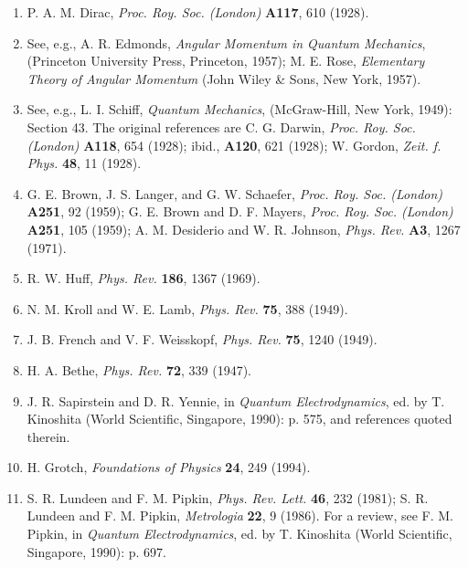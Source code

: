 \begin{enumerate}
\item \hypertarget{ref:14.1}{}P. A. M. Dirac, \emph{Proc. Roy. Soc.
(London)} \textbf{A117}, 610 (1928).

\item \hypertarget{ref:14.2}{}See, e.g., A. R. Edmonds, \emph{Angular
Momentum in Quantum Mechanics}, (Princeton University Press, Princeton,
1957); M. E. Rose, \emph{Elementary Theory of Angular Momentum} (John Wiley
\& Sons, New York, 1957).

\item \hypertarget{ref:14.3}{}See, e.g., L. I. Schiff, \emph{Quantum
Mechanics}, (McGraw-Hill, New York, 1949): Section 43. The original references
are C. G. Darwin, \emph{Proc. Roy. Soc. (London)} \textbf{A118}, 654 (1928);
ibid., \textbf{A120}, 621 (1928); W. Gordon, \emph{Zeit. f. Phys.} \textbf{48},
11 (1928).

\item \hypertarget{ref:14.4}{}G. E. Brown, J. S. Langer, and G. W. Schaefer,
\emph{Proc. Roy. Soc. (London)} \textbf{A251}, 92 (1959); G. E. Brown and
D. F. Mayers, \emph{Proc. Roy. Soc. (London)} \textbf{A251}, 105 (1959);
A. M. Desiderio and W. R. Johnson, \emph{Phys. Rev.} \textbf{A3}, 1267
(1971).

\item \hypertarget{ref:14.5}{}R. W. Huff, \emph{Phys. Rev.} \textbf{186},
1367 (1969).

\item \hypertarget{ref:14.6}{}N. M. Kroll and W. E. Lamb, \emph{Phys. Rev.}
\textbf{75}, 388 (1949).

\item \hypertarget{ref:14.7}{}J. B. French and V. F. Weisskopf,
\emph{Phys. Rev.} \textbf{75}, 1240 (1949).

\item \hypertarget{ref:14.8}{}H. A. Bethe, \emph{Phys. Rev.} \textbf{72},
339 (1947).

\item \hypertarget{ref:14.9}{}J. R. Sapirstein and D. R. Yennie, in
\emph{Quantum Electrodynamics}, ed. by T. Kinoshita (World Scientific,
Singapore, 1990): p. 575, and references quoted therein.

\item \hypertarget{ref:14.10}{}H. Grotch, \emph{Foundations of Physics}
\textbf{24}, 249 (1994).

\item \hypertarget{ref:14.11}{}S. R. Lundeen and F. M. Pipkin,
\emph{Phys. Rev. Lett.} \textbf{46}, 232 (1981); S. R. Lundeen and
F. M. Pipkin, \emph{Metrologia} \textbf{22}, 9 (1986). For a review, see
F. M. Pipkin, in \emph{Quantum Electrodynamics}, ed. by T. Kinoshita (World
Scientific, Singapore, 1990): p. 697.


\end{enumerate}
